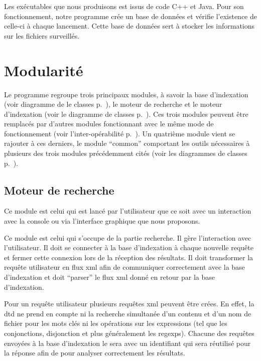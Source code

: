 \documentclass[a4paper,12pt]{report}
\begin{document}
Les exécutables que nous produisons est issus de code C++ et Java.
Pour son fonctionnement, notre programme crée un base de données et vérifie l'existence de celle-ci à chaque lancement. Cette base de données sert à stocker les informations sur les \glspl{fichier} surveillés.

\section{Modularité}
Le programme regroupe trois principaux modules, à savoir la base d'indexation (voir diagramme de le classes p.~\pageref{diagramme_classes_bi}), le moteur de recherche  et le moteur d'indexation (voir le diagramme de classes p.~\pageref{diagramme_classes_bi}). Ces trois modules peuvent être remplacés par d'autres modules fonctionnant avec le même mode de fonctionnement (voir l'inter-opérabilité p.~\pageref{inter_operabilite}). Un quatrième module vient se rajouter à ces derniers, le module \enquote{common} comportant les outils nécessaires à plusieurs des trois modules précédemment cités (voir les diagrammes de classes p.~\pageref{common}).

\subsection{Moteur de recherche}
Ce module est celui qui est lancé par l'utilisateur que ce soit avec un interaction avec la \gls{console} ou via l'interface graphique que nous proposons.

Ce module est celui qui s'occupe de la partie recherche. Il gère l'interaction avec l'utilisateur. Il doit se connecter à la base d'indexation à chaque nouvelle requête et fermer cette connexion lors de la réception des résultats. Il doit transformer la requête utilisateur en flux \gls{xml} afin de communiquer correctement avec la base d'indexation et doit \enquote{\gls{parser}} le flux \gls{xml} donné  en retour par la base d'indexation.

Pour un requête utilisateur plusieurs requêtes \gls{xml} peuvent être crées. En effet, la \gls{dtd} ne prend en compte ni la recherche simultanée d'un contenu et d'un nom de \gls{fichier} pour les mots clés ni les opérations sur les expressions (tel que les conjonctions, disjonction et plus généralement les \glspl{regexp}). Chacune des requêtes envoyées à la base d'indexation le sera avec un identifiant qui sera réutilisé pour la réponse afin de pour analyser correctement les résultats.
\end{document}
